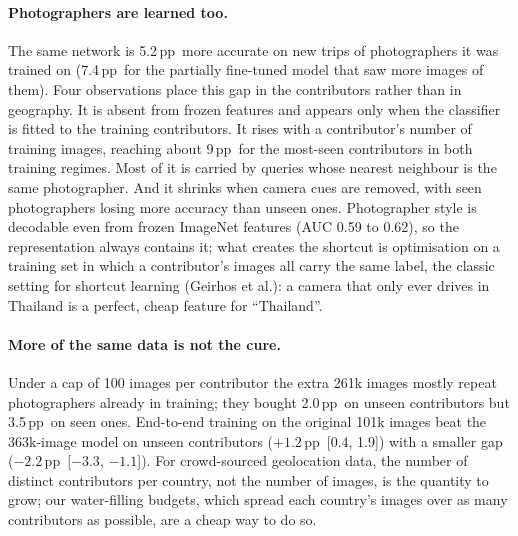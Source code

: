 \documentclass[clean,twocolumn]{bam-project}
\newcommand{\pp}{\,pp}
\begin{document}
\paragraph{Photographers are learned too.} The same network is 5.2\pp\ more accurate on new trips of
photographers it was trained on (7.4\pp\ for the partially fine-tuned model that saw more images of
them). Four observations place this gap in the contributors rather than in geography. It is absent from
frozen features and appears only when the classifier is fitted to the training contributors. It rises
with a contributor's number of training images, reaching about 9\pp\ for the most-seen contributors in
both training regimes. Most of it is carried by queries whose nearest neighbour is the same photographer.
And it shrinks when camera cues are removed, with seen photographers losing more accuracy than unseen
ones. Photographer style is decodable even from frozen ImageNet features (AUC 0.59 to 0.62), so the
representation always contains it; what creates the shortcut is optimisation on a training set in which
a contributor's images all carry the same label, the classic setting for shortcut learning (Geirhos et
al.): a camera that only ever drives in Thailand is a perfect, cheap feature for ``Thailand''.

\paragraph{More of the same data is not the cure.} Under a cap of 100 images per contributor the extra
261k images mostly repeat photographers already in training; they bought 2.0\pp\ on unseen contributors but
3.5\pp\ on seen ones. End-to-end training on the original 101k images beat the 363k-image model on unseen
contributors ($+1.2$\pp\ [0.4, 1.9]) with a smaller gap ($-2.2$\pp\ [$-3.3$, $-1.1$]). For crowd-sourced
geolocation data, the number of distinct contributors per country, not the number of images, is the
quantity to grow; our water-filling budgets, which spread each country's images over as many contributors
as possible, are a cheap way to do so.
\end{document}
